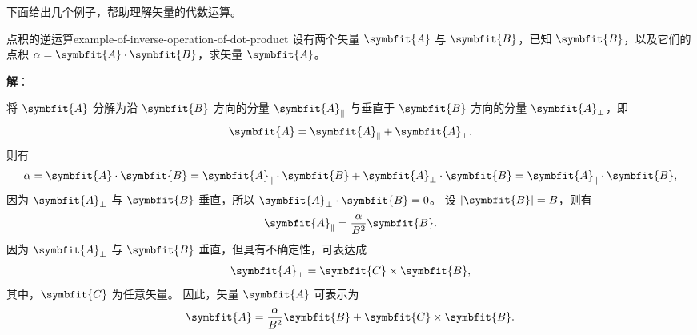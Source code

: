 \bigskip

下面给出几个例子，帮助理解矢量的代数运算。
\begin{example}{点积的逆运算}{example-of-inverse-operation-of-dot-product}
    设有两个矢量 $ \symbfit{A} $ 与 $ \symbfit{B} $，已知 $ \symbfit{B} $，以及它们的点积 $ \alpha = \symbfit{A} \cdot \symbfit{B} $，求矢量 $ \symbfit{A} $。

    \textbf{解}：

    将 $ \symbfit{A} $ 分解为沿 $ \symbfit{B} $ 方向的分量 $ \symbfit{A}_{\parallel} $ 与垂直于 $ \symbfit{B} $ 方向的分量 $ \symbfit{A}_{\perp} $，即
    \begin{equation}
        \symbfit{A} = \symbfit{A}_{\parallel} + \symbfit{A}_{\perp} .
    \end{equation}
    则有
    \begin{equation}
        \alpha = \symbfit{A} \cdot \symbfit{B} = \symbfit{A}_{\parallel} \cdot \symbfit{B} + \symbfit{A}_{\perp} \cdot \symbfit{B} = \symbfit{A}_{\parallel} \cdot \symbfit{B} ,
    \end{equation}
    因为 $ \symbfit{A}_{\perp} $ 与 $ \symbfit{B} $ 垂直，所以 $ \symbfit{A}_{\perp} \cdot \symbfit{B} = 0 $。
    设 $ |\symbfit{B}| = B $，则有
    \begin{equation}
        \symbfit{A}_{\parallel} = \frac{\alpha}{B^2} \symbfit{B} .
    \end{equation}
    因为 $ \symbfit{A}_{\perp} $ 与 $ \symbfit{B} $ 垂直，但具有不确定性，可表达成
    \begin{equation}
        \symbfit{A}_{\perp} = \symbfit{C} \times \symbfit{B} ,
    \end{equation}
    其中，$ \symbfit{C} $ 为任意矢量。
    因此，矢量 $ \symbfit{A} $ 可表示为
    \begin{equation}
        \symbfit{A} = \frac{\alpha}{B^2} \symbfit{B} + \symbfit{C} \times \symbfit{B} .
    \end{equation}
\end{example}

